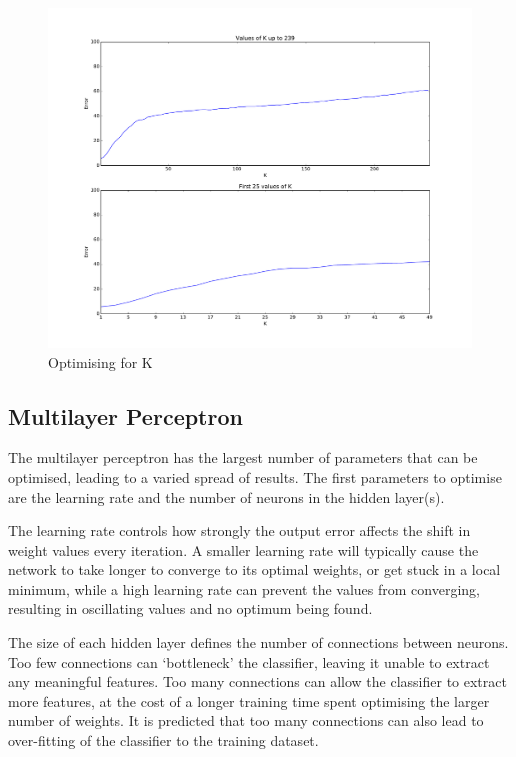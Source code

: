 \begin{figure}
	\centering
	\includegraphics[width=\textwidth]{figures/k_values239}
	\caption{Optimising for K}
	\label{fig:k_values}
	\centering
\end{figure}

\subsection{Multilayer Perceptron}
The multilayer perceptron has the largest number of parameters that can be optimised, leading to a varied spread of results. The first parameters to optimise are the learning rate and the number of neurons in the hidden layer(s).

The learning rate controls how strongly the output error affects the shift in weight values every iteration. A smaller learning rate will typically cause the network to take longer to converge to its optimal weights, or get stuck in a local minimum, while a high learning rate can prevent the values from converging, resulting in oscillating values and no optimum being found.

The size of each hidden layer defines the number of connections between neurons. Too few connections can `bottleneck' the classifier, leaving it unable to extract any meaningful features. Too many connections can allow the classifier to extract more features, at the cost of a longer training time spent optimising the larger number of weights. It is predicted that too many connections can also lead to over-fitting of the classifier to the training dataset.

